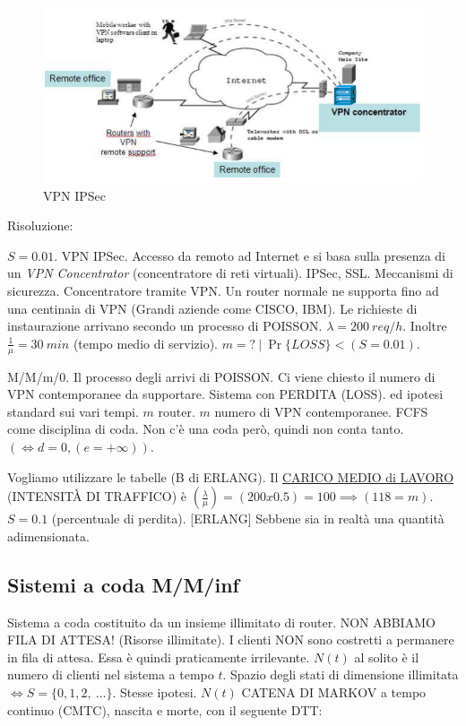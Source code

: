 \begin{center}
\begin{figure}[H]
\centering
\includegraphics[scale=0.8]{figures/ex/VPN.png}
\caption{VPN IPSec}
\end{figure}
\end{center}

Risoluzione:

$S=0.01$. VPN IPSec. Accesso da remoto ad Internet e si basa sulla presenza di un \textit{VPN Concentrator} (concentratore di reti virtuali). IPSec, SSL. Meccanismi di sicurezza. Concentratore tramite VPN. Un router normale ne supporta fino ad una centinaia di VPN (Grandi aziende come CISCO, IBM). Le richieste di instaurazione arrivano secondo un processo di POISSON. $\lambda = 200\ req/h$. Inoltre $\frac{1}{\mu} = 30\ min$ (tempo medio di servizio). $m=?\ |\ \Pr\{LOSS\} < (S = 0.01)$.

M/M/m/0. Il processo degli arrivi di POISSON. Ci viene chiesto il numero di VPN contemporanee da supportare. Sistema con PERDITA (LOSS). ed ipotesi standard sui vari tempi. $m$ router. $m$ numero di VPN contemporanee. FCFS come disciplina di coda. Non c'è una coda però, quindi non conta tanto. $(\iff d=0, (e=+\infty))$.

Vogliamo utilizzare le tabelle (B di ERLANG). Il \underline{CARICO MEDIO di LAVORO} (INTENSIT\`A DI TRAFFICO) è $(\frac{\lambda}{\mu}) = (200 x 0.5) = 100 \implies (118=m)$. $S = 0.1$ (percentuale di perdita). [ERLANG] Sebbene sia in realtà una quantità adimensionata.

\newpage

\subsection{Sistemi a coda M/M/inf}

Sistema a coda costituito da un insieme illimitato di router. NON ABBIAMO FILA DI ATTESA! (Risorse illimitate). I clienti NON sono costretti a permanere in fila di attesa. Essa è quindi praticamente irrilevante. $N(t)$ al solito è il numero di clienti nel sistema a tempo $t$. Spazio degli stati di dimensione illimitata $\iff S=\{0,1,2,\ \dots\}$. Stesse ipotesi. $N(t)$  CATENA DI MARKOV a tempo continuo (CMTC), nascita e morte, con il seguente DTT:

